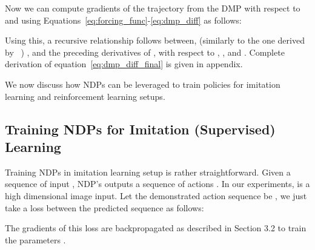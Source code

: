 \documentclass{article}
\newcommand{\our}{NDP\xspace}
\newcommand{\ours}{NDPs\xspace}
\begin{document}
Now we can compute gradients of the trajectory from the DMP with respect to  and  using Equations~\eqref{eq:forcing_func}-\eqref{eq:dmp_diff} as follows:

Using this, a recursive relationship follows between, (similarly to the one derived by ~\citet{pahic2018deepenc}) ,  and the preceding derivatives of ,  with respect to , ,  and . Complete derivation of equation~\eqref{eq:dmp_diff_final} is given in appendix.

We now discuss how \ours can be leveraged to train policies for imitation learning and reinforcement learning setups.

\subsection{Training NDPs for Imitation (Supervised) Learning}
\label{sec:dmp-sl}
Training NDPs in imitation learning setup is rather straightforward. Given a sequence of input , \our's  outputs a sequence of actions {}. In our experiments,  is a high dimensional image input. Let the demonstrated action sequence be , we just take a loss between the predicted sequence as follows:


The gradients of this loss are backpropagated as described in Section 3.2 to train the parameters .
\end{document}
